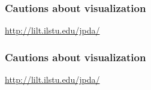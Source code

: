 \documentclass[handout]{beamer}
\begin{document}

   \begin{frame} \frametitle{Cautions about visualization}

   \begin{figure}
   \centering
   \end{figure}

   \href{http://lilt.ilstu.edu/jpda/}{http://lilt.ilstu.edu/jpda/}
   \end{frame}


   \begin{frame} \frametitle{Cautions about visualization}

   \begin{figure}
   \centering
   \end{figure}

   \href{http://lilt.ilstu.edu/jpda/}{http://lilt.ilstu.edu/jpda/}
   \end{frame}


   \begin{frame} 

   \end{frame}

   
\end{document}
